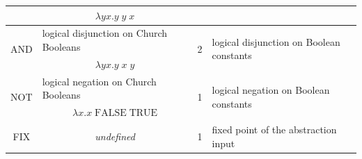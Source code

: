 \documentclass[table, a4paper, 10pt]{article}
\begin{document}
\begin{table}[H]
\begin{tabular}{cclcl}
\multicolumn{1}{|c|}{}                        & \multicolumn{2}{c|}{$\lambda yx.y\;y\;x$}                                                                                                   & \multicolumn{1}{c|}{}                   & \multicolumn{1}{l|}{}                                                                                                                                             \\ \hline
\multicolumn{1}{|c|}{\multirow{2}{*}{AND}}    & \multicolumn{2}{l|}{logical disjunction on Church Booleans}                                                                                 & \multicolumn{1}{c|}{\multirow{2}{*}{2}} & \multicolumn{1}{l|}{\multirow{2}{*}{logical disjunction on Boolean constants}}                                                                                    \\ \cline{2-3}
\multicolumn{1}{|c|}{}                        & \multicolumn{2}{c|}{$\lambda yx.y\;x\;y$}                                                                                                   & \multicolumn{1}{c|}{}                   & \multicolumn{1}{l|}{}                                                                                                                                             \\ \hline
\multicolumn{1}{|c|}{\multirow{2}{*}{NOT}}    & \multicolumn{2}{l|}{logical negation on Church Booleans}                                                                                    & \multicolumn{1}{c|}{\multirow{2}{*}{1}} & \multicolumn{1}{l|}{\multirow{2}{*}{logical negation on Boolean constants}}                                                                                       \\ \cline{2-3}
\multicolumn{1}{|c|}{}                        & \multicolumn{2}{c|}{$\lambda x.x\;\mathrm{FALSE}\;\mathrm{TRUE}$}                                                                           & \multicolumn{1}{c|}{}                   & \multicolumn{1}{l|}{}                                                                                                                                             \\ \hline
\multicolumn{1}{|c|}{\multirow{2}{*}{FIX}}    & \multicolumn{2}{c|}{\multirow{2}{*}{\textit{undefined}}}                                                                                    & \multicolumn{1}{c|}{\multirow{2}{*}{1}} & \multicolumn{1}{l|}{\multirow{2}{*}{fixed point of the abstraction input}}                                                                                        \\

\end{tabular}
\end{table}
\end{document}
